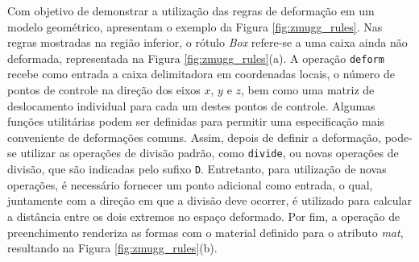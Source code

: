 \newpage

Com objetivo de demonstrar a utilização das regras de deformação em um modelo geométrico,  apresentam o exemplo da Figura \ref{fig:zmugg_rules}. Nas regras mostradas na região inferior, o rótulo \textit{Box} refere-se a uma caixa ainda não deformada, representada na Figura \ref{fig:zmugg_rules}(a). A operação \texttt{deform} recebe como entrada a caixa delimitadora em coordenadas locais, o número de pontos de controle na direção dos eixos $x$, $y$ e $z$, bem como uma matriz de deslocamento individual para cada um destes pontos de controle. Algumas funções utilitárias podem ser definidas para permitir uma especificação mais conveniente de deformações comuns. Assim, depois de definir a deformação, pode-se utilizar as operações de divisão padrão, como \texttt{divide}, ou novas operações de divisão, que são indicadas pelo sufixo \texttt{D}. Entretanto, para utilização de novas operações, é necessário fornecer um ponto adicional como entrada, o qual, juntamente com a direção em que a divisão deve ocorrer, é utilizado para calcular a distância entre os dois extremos no espaço deformado. Por fim, a operação de preenchimento renderiza as formas com o material definido para o atributo \textit{mat}, resultando na Figura \ref{fig:zmugg_rules}(b).

\begin{figure}[h!]
	\centering
	\captionsetup{width=15cm}
	{}	
\end{figure}

